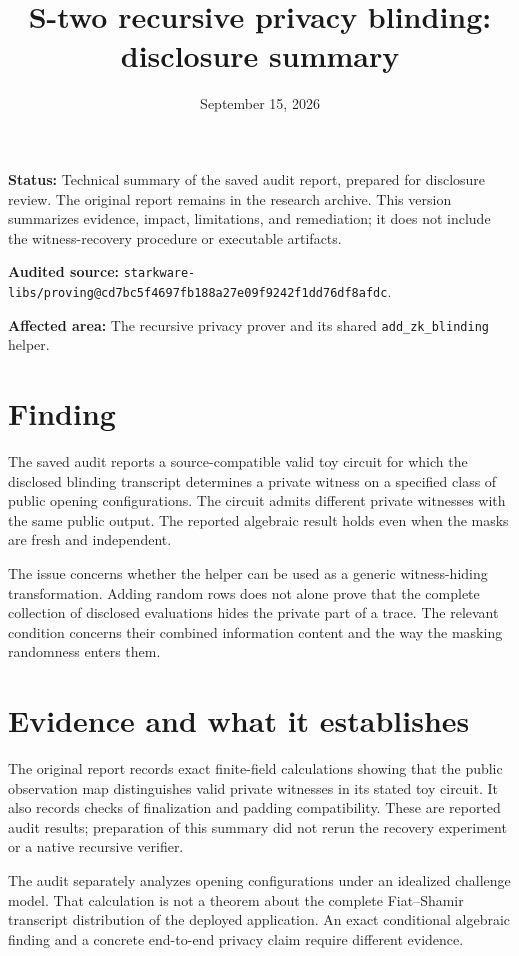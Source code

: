 \documentclass[11pt]{article}
\title{S-two recursive privacy blinding: disclosure summary}
\author{}
\date{September 15, 2026}
\begin{document}
\maketitle

\textbf{Status:} Technical summary of the saved audit report, prepared for
disclosure review. The original report remains in the research archive.
This version summarizes evidence, impact, limitations, and remediation;
it does not include the witness-recovery procedure or executable artifacts.

\textbf{Audited source:}
\nolinkurl{starkware-libs/proving@cd7bc5f4697fb188a27e09f9242f1dd76df8afdc}.

\textbf{Affected area:} The recursive privacy prover and its shared
\texttt{add\_zk\_blinding} helper.

\section*{Finding}

The saved audit reports a source-compatible valid toy circuit for which
the disclosed blinding transcript determines a private witness on a
specified class of public opening configurations. The circuit admits
different private witnesses with the same public output. The reported
algebraic result holds even when the masks are fresh and independent.

The issue concerns whether the helper can be used as a generic
witness-hiding transformation. Adding random rows does not alone prove
that the complete collection of disclosed evaluations hides the private
part of a trace. The relevant condition concerns their combined
information content and the way the masking randomness enters them.

\section*{Evidence and what it establishes}

The original report records exact finite-field calculations showing
that the public observation map distinguishes valid private witnesses
in its stated toy circuit. It also records checks of finalization and
padding compatibility. These are reported audit results; preparation
of this summary did not rerun the recovery experiment or a native
recursive verifier.

The audit separately analyzes opening configurations under an idealized
challenge model. That calculation is not a theorem about the complete
Fiat--Shamir transcript distribution of the deployed application.
An exact conditional algebraic finding and a concrete end-to-end
privacy claim require different evidence.
\end{document}
